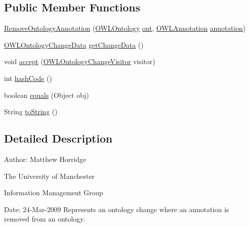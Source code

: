 \subsection*{Public Member Functions}
\begin{DoxyCompactItemize}
\item 
\hyperlink{classorg_1_1semanticweb_1_1owlapi_1_1model_1_1_remove_ontology_annotation_ace704a684bc90e63dc6ec343c519291f}{Remove\-Ontology\-Annotation} (\hyperlink{interfaceorg_1_1semanticweb_1_1owlapi_1_1model_1_1_o_w_l_ontology}{O\-W\-L\-Ontology} \hyperlink{classorg_1_1semanticweb_1_1owlapi_1_1model_1_1_o_w_l_ontology_change_a9b8b64f1cab33aae500db20e19186211}{ont}, \hyperlink{interfaceorg_1_1semanticweb_1_1owlapi_1_1model_1_1_o_w_l_annotation}{O\-W\-L\-Annotation} \hyperlink{classorg_1_1semanticweb_1_1owlapi_1_1model_1_1_annotation_change_a82541adcd6969af37b2d2c2663e7f69c}{annotation})
\item 
\hyperlink{classorg_1_1semanticweb_1_1owlapi_1_1change_1_1_o_w_l_ontology_change_data}{O\-W\-L\-Ontology\-Change\-Data} \hyperlink{classorg_1_1semanticweb_1_1owlapi_1_1model_1_1_remove_ontology_annotation_a1cb02cc6da1bf69672db6fdc3ffe790c}{get\-Change\-Data} ()
\item 
void \hyperlink{classorg_1_1semanticweb_1_1owlapi_1_1model_1_1_remove_ontology_annotation_a7ac8359582c003826e99fc287cd0d2d7}{accept} (\hyperlink{interfaceorg_1_1semanticweb_1_1owlapi_1_1model_1_1_o_w_l_ontology_change_visitor}{O\-W\-L\-Ontology\-Change\-Visitor} visitor)
\item 
int \hyperlink{classorg_1_1semanticweb_1_1owlapi_1_1model_1_1_remove_ontology_annotation_a408f2bc43885a60be4dbe390be9f5c92}{hash\-Code} ()
\item 
boolean \hyperlink{classorg_1_1semanticweb_1_1owlapi_1_1model_1_1_remove_ontology_annotation_a778ccc1bc88b7b7af677b969e1f26f97}{equals} (Object obj)
\item 
String \hyperlink{classorg_1_1semanticweb_1_1owlapi_1_1model_1_1_remove_ontology_annotation_a0e16aa872f18a5752ddd422dd3dea711}{to\-String} ()
\end{DoxyCompactItemize}


\subsection{Detailed Description}
Author\-: Matthew Horridge\par
 The University of Manchester\par
 Information Management Group\par
 Date\-: 24-\/\-Mar-\/2009 Represents an ontology change where an annotation is removed from an ontology. 

